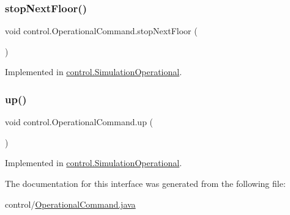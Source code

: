 \subsubsection{\texorpdfstring{stopNextFloor()}{stopNextFloor()}}
{\footnotesize\ttfamily void control.\+Operational\+Command.\+stop\+Next\+Floor (\begin{DoxyParamCaption}{ }\end{DoxyParamCaption})}



Implemented in \mbox{\hyperlink{classcontrol_1_1_simulation_operational_a2ca8414424f8becf5c5942b9dbba80aa}{control.\+Simulation\+Operational}}.

\mbox{\label{interfacecontrol_1_1_operational_command_a23231ea40f8bf5cd07b864238f258b5f}} 
\subsubsection{\texorpdfstring{up()}{up()}}
{\footnotesize\ttfamily void control.\+Operational\+Command.\+up (\begin{DoxyParamCaption}{ }\end{DoxyParamCaption})}



Implemented in \mbox{\hyperlink{classcontrol_1_1_simulation_operational_ab3ade4511703ee9715f82ce6e9a036a0}{control.\+Simulation\+Operational}}.



The documentation for this interface was generated from the following file\+:\begin{DoxyCompactItemize}
\item 
control/\mbox{\hyperlink{_operational_command_8java}{Operational\+Command.\+java}}\end{DoxyCompactItemize}
